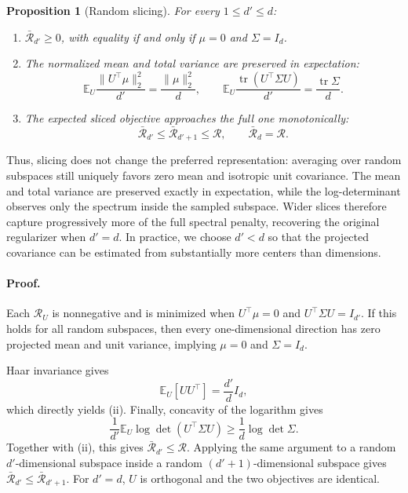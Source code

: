 \documentclass{article} %
\newtheorem{proposition}[theorem]{Proposition}
\theoremstyle{remark}
\begin{document}
\begin{proposition}[Random slicing]
For every $1\le d'\le d$:

\begin{enumerate}[leftmargin=*]
\item[(i)] $\bar{\mathcal R}_{d'}\ge0$, with equality if and only if
$\mu=0$ and $\Sigma=I_d$.

\item[(ii)] The normalized mean and total variance are preserved in
expectation:
\[
\mathbb E_U\frac{\|U^\top\mu\|_2^2}{d'}
=
\frac{\|\mu\|_2^2}{d},
\qquad
\mathbb E_U\frac{\operatorname{tr}(U^\top\Sigma U)}{d'}
=
\frac{\operatorname{tr}\Sigma}{d}.
\]

\item[(iii)] The expected sliced objective approaches the full one
monotonically:
\[
\bar{\mathcal R}_{d'}
\le
\bar{\mathcal R}_{d'+1}
\le
\mathcal R,
\qquad
\bar{\mathcal R}_{d}=\mathcal R.
\]
\end{enumerate}
\end{proposition}

Thus, slicing does not change the preferred representation: averaging
over random subspaces still uniquely favors zero mean and isotropic
unit covariance. The mean and total variance are preserved exactly in
expectation, while the log-determinant observes only the spectrum inside
the sampled subspace. Wider slices therefore capture progressively more
of the full spectral penalty, recovering the original regularizer when
$d'=d$. In practice, we choose $d'<d$ so that the projected covariance
can be estimated from substantially more centers than dimensions.

\paragraph{Proof.}
Each $\mathcal R_U$ is nonnegative and is minimized when
$U^\top\mu=0$ and $U^\top\Sigma U=I_{d'}$. If this holds for all random
subspaces, then every one-dimensional direction has zero projected mean
and unit variance, implying $\mu=0$ and $\Sigma=I_d$.

Haar invariance gives
\[
\mathbb E_U[UU^\top]=\frac{d'}{d}I_d,
\]
which directly yields (ii). Finally, concavity of the logarithm gives
\[
\frac{1}{d'}\mathbb E_U
\log\det(U^\top\Sigma U)
\ge
\frac{1}{d}\log\det\Sigma.
\]
Together with (ii), this gives
$\bar{\mathcal R}_{d'}\le\mathcal R$.
Applying the same argument to a random $d'$-dimensional subspace inside
a random $(d'+1)$-dimensional subspace gives
$\bar{\mathcal R}_{d'}\le\bar{\mathcal R}_{d'+1}$.
For $d'=d$, $U$ is orthogonal and the two objectives are identical.
\end{document}
